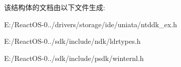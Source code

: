 该结构体的文档由以下文件生成\+:\begin{DoxyCompactItemize}
\item 
E\+:/\+React\+O\+S-\/0../drivers/storage/ide/uniata/ntddk\+\_\+ex.\+h\item 
E\+:/\+React\+O\+S-\/0../sdk/include/ndk/ldrtypes.\+h\item 
E\+:/\+React\+O\+S-\/0../sdk/include/psdk/winternl.\+h\end{DoxyCompactItemize}

